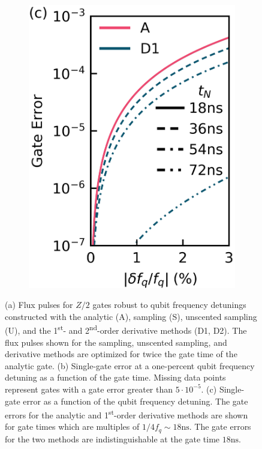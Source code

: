 \documentclass[
  amsfonts,
  amsmath,
  amssymb,
  pra,
  twocolumn,
  superscriptaddress,
]{revtex4-2}
\begin{document}
\begin{figure}[ht]
\begin{subfigure}{.4\textwidth}
  \end{subfigure}\hfill
  \begin{subfigure}{.23\textwidth}
    \includegraphics[width=\linewidth]{f2c.png}
    \caption{\label{fig:staticc}}
  \end{subfigure}
  \caption{
    (a) Flux pulses for $Z/2$ gates robust to qubit frequency detunings constructed with the
    analytic (A), sampling (S), unscented sampling (U), and the 1\textsuperscript{st}-
    and 2\textsuperscript{nd}-order derivative methods (D1, D2). The flux pulses shown
    for the sampling, unscented sampling, and derivative methods are optimized
    for twice the gate time of the analytic gate.
    (b) Single-gate error at a one-percent qubit frequency detuning as
    a function of the gate time. Missing
    data points represent gates with a gate error greater than $5 \cdot 10^{-5}$.
    (c) Single-gate error as a function of the qubit frequency detuning.
    The gate errors for the analytic and 1\textsuperscript{st}-order derivative
    methods are shown for gate times which are multiples of $1 / 4 f_{q} \sim 18 \textrm{ns}$.
    The gate errors for the two methods are
    indistinguishable at the gate time $18 \textrm{ns}$.
  }
  \label{fig:static}
\end{figure}
\end{document}
